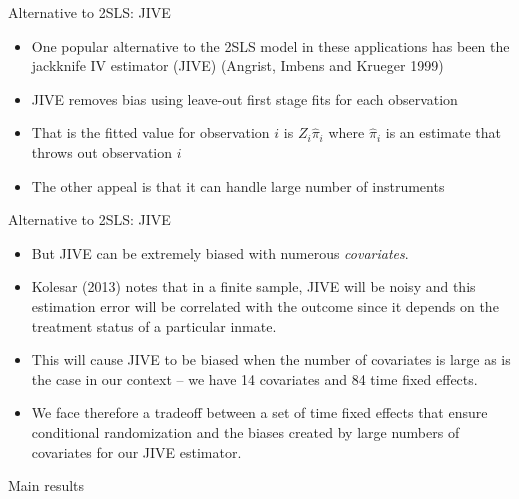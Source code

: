 \documentclass{beamer}
\begin{document}
\begin{frame}{Alternative to 2SLS: JIVE}

  \begin{itemize}
    \item One popular alternative to the 2SLS model in these applications has been the jackknife IV estimator (JIVE) (Angrist, Imbens and Krueger 1999)

    \item JIVE removes bias using leave-out first stage fits for each observation

    \item That is the fitted value for observation $i$ is $Z_i\widehat{\pi}_{i}$ where $\widehat{\pi}_i$ is an estimate that throws out observation $i$

    \item The other appeal is that it can handle large number of instruments

  \end{itemize}

\end{frame}


\begin{frame}{Alternative to 2SLS: JIVE}

  \begin{itemize}

    \item But JIVE can be extremely biased with numerous \emph{covariates}.

    \item Kolesar (2013) notes that in a finite sample, JIVE will be noisy and this estimation error will be correlated with the outcome since it depends on the treatment status of a particular inmate.

    \item This will cause JIVE to be biased when the number of covariates is large as is the case in our context -- we have 14 covariates and 84 time fixed effects.

    \item We face therefore a tradeoff between a set of time fixed effects that ensure conditional randomization and the biases created by large numbers of covariates for our JIVE estimator.

  \end{itemize}

\end{frame}


\begin{frame}[shrink=20]{Main results}

  

\end{frame}
\end{document}
